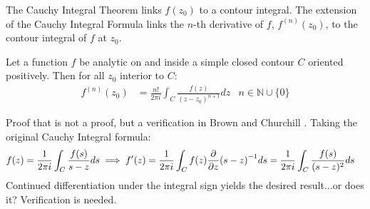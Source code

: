 \documentclass[12pt, english]{book}
\makeatletter
\renewenvironment{proof}[1][\proofname]{\par
	\pushQED{\qed}%
	\normalfont \topsep6\p@\@plus6\p@\relax
	\list{}{%
		\settowidth{\leftmargin}{\itshape\proofname:\hskip\labelsep}%
		\setlength{\labelwidth}{0pt}%
		\setlength{\itemindent}{-\leftmargin}%
	}%
	\item[\hskip\labelsep\itshape#1\@addpunct{:}]\ignorespaces
}{%
	\popQED\endlist\@endpefalse
}
\makeatother
\begin{document}
	The Cauchy Integral Theorem links \(f(z_0)\) to a contour integral. The extension of the Cauchy Integral Formula links the \(n\)-th derivative of \(f\), \(f^{(n)}(z_0)\), to the contour integral of \(f\) at \(z_0\).
	\begin{theorem}
		\label{Cauchy Integral Formula (Extension) - Complex}
		Let a function \(f\) be analytic on and inside a simple closed contour \(C\) oriented positively. Then for all \(z_0\) interior to \(C\):
		\begin{align*}
			f^{(n)}(z_0) &= \frac{n!}{2\pi i} \int_{C} \frac{f(z)}{(z-z_0)^{n+1}} dz & n \in \mathbb{N} \cup \{0\}
		\end{align*}
	\end{theorem}
	\begin{proof}
		Proof that is not a proof, but a verification in Brown and Churchill \cite{Brown.J;Churchill.R-Complex-Variables-2014}. \newline
		Taking the original Cauchy Integral formula:
		\begin{align*}
			f(z) = \frac{1}{2\pi i} \int_{C} \frac{f(s)}{s-z} ds
			&\implies f'(z) = \frac{1}{2\pi i} \int_{C} f(z) \pdv{z}(s-z)^{-1} ds = \frac{1}{2\pi i} \int_{C} \frac{f(s)}{(s-z)^2} ds
		\end{align*}
		Continued differentiation under the integral sign yields the desired result...or does it? Verification is needed. 
		

\end{proof}
\end{document}
